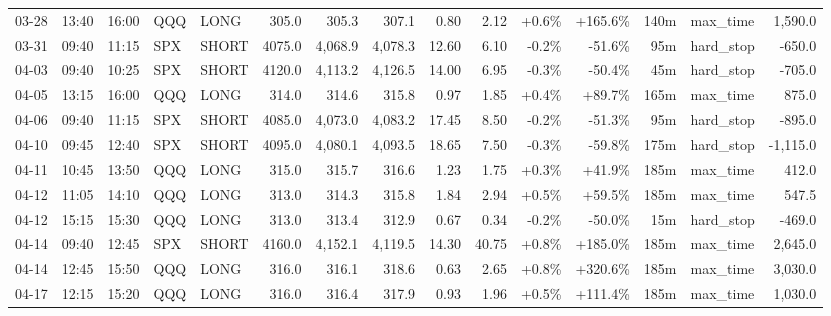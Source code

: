 \documentclass[11pt,a4paper,twoside]{article}
\begin{document}
\begin{landscape}
\begin{center}
\begin{longtable}{>{\color{txtmain}}l l l l l r r r r r r r r >{\color{txtmain}}l r}
03-28 & 13:40 & 16:00 & QQQ & LONG & 305.0 & 305.3 & 307.1 & 0.80 & 2.12 & \textcolor{wingreen}{+0.6\%} & \textcolor{wingreen}{+165.6\%} & 140m & max\_time & \textcolor{wingreen}{1,590.0} \\
03-31 & 09:40 & 11:15 & SPX & SHORT & 4075.0 & 4,068.9 & 4,078.3 & 12.60 & 6.10 & \textcolor{lossred}{-0.2\%} & \textcolor{lossred}{-51.6\%} & 95m & hard\_stop & \textcolor{lossred}{-650.0} \\
04-03 & 09:40 & 10:25 & SPX & SHORT & 4120.0 & 4,113.2 & 4,126.5 & 14.00 & 6.95 & \textcolor{lossred}{-0.3\%} & \textcolor{lossred}{-50.4\%} & 45m & hard\_stop & \textcolor{lossred}{-705.0} \\
04-05 & 13:15 & 16:00 & QQQ & LONG & 314.0 & 314.6 & 315.8 & 0.97 & 1.85 & \textcolor{wingreen}{+0.4\%} & \textcolor{wingreen}{+89.7\%} & 165m & max\_time & \textcolor{wingreen}{875.0} \\
04-06 & 09:40 & 11:15 & SPX & SHORT & 4085.0 & 4,073.0 & 4,083.2 & 17.45 & 8.50 & \textcolor{lossred}{-0.2\%} & \textcolor{lossred}{-51.3\%} & 95m & hard\_stop & \textcolor{lossred}{-895.0} \\
04-10 & 09:45 & 12:40 & SPX & SHORT & 4095.0 & 4,080.1 & 4,093.5 & 18.65 & 7.50 & \textcolor{lossred}{-0.3\%} & \textcolor{lossred}{-59.8\%} & 175m & hard\_stop & \textcolor{lossred}{-1,115.0} \\
04-11 & 10:45 & 13:50 & QQQ & LONG & 315.0 & 315.7 & 316.6 & 1.23 & 1.75 & \textcolor{wingreen}{+0.3\%} & \textcolor{wingreen}{+41.9\%} & 185m & max\_time & \textcolor{wingreen}{412.0} \\
04-12 & 11:05 & 14:10 & QQQ & LONG & 313.0 & 314.3 & 315.8 & 1.84 & 2.94 & \textcolor{wingreen}{+0.5\%} & \textcolor{wingreen}{+59.5\%} & 185m & max\_time & \textcolor{wingreen}{547.5} \\
04-12 & 15:15 & 15:30 & QQQ & LONG & 313.0 & 313.4 & 312.9 & 0.67 & 0.34 & \textcolor{lossred}{-0.2\%} & \textcolor{lossred}{-50.0\%} & 15m & hard\_stop & \textcolor{lossred}{-469.0} \\
04-14 & 09:40 & 12:45 & SPX & SHORT & 4160.0 & 4,152.1 & 4,119.5 & 14.30 & 40.75 & \textcolor{wingreen}{+0.8\%} & \textcolor{wingreen}{+185.0\%} & 185m & max\_time & \textcolor{wingreen}{2,645.0} \\
04-14 & 12:45 & 15:50 & QQQ & LONG & 316.0 & 316.1 & 318.6 & 0.63 & 2.65 & \textcolor{wingreen}{+0.8\%} & \textcolor{wingreen}{+320.6\%} & 185m & max\_time & \textcolor{wingreen}{3,030.0} \\
04-17 & 12:15 & 15:20 & QQQ & LONG & 316.0 & 316.4 & 317.9 & 0.93 & 1.96 & \textcolor{wingreen}{+0.5\%} & \textcolor{wingreen}{+111.4\%} & 185m & max\_time & \textcolor{wingreen}{1,030.0} \\

\end{longtable}
\end{center}
\end{landscape}
\end{document}
